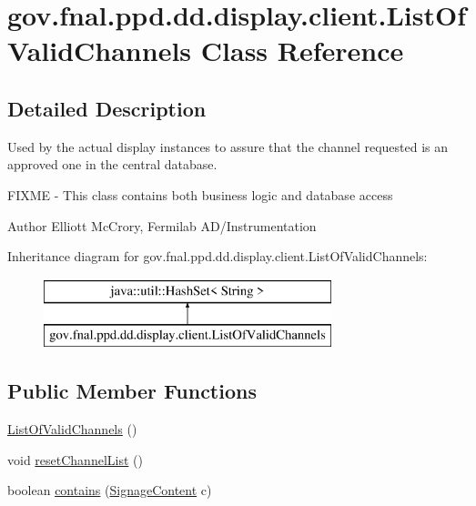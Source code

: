 \hypertarget{classgov_1_1fnal_1_1ppd_1_1dd_1_1display_1_1client_1_1ListOfValidChannels}{\section{gov.\-fnal.\-ppd.\-dd.\-display.\-client.\-List\-Of\-Valid\-Channels Class Reference}
\label{classgov_1_1fnal_1_1ppd_1_1dd_1_1display_1_1client_1_1ListOfValidChannels}
}


\subsection{Detailed Description}
Used by the actual display instances to assure that the channel requested is an approved one in the central database.

F\-I\-X\-M\-E -\/ This class contains both business logic and database access

\begin{DoxyAuthor}{Author}
Elliott Mc\-Crory, Fermilab A\-D/\-Instrumentation 
\end{DoxyAuthor}
Inheritance diagram for gov.\-fnal.\-ppd.\-dd.\-display.\-client.\-List\-Of\-Valid\-Channels\-:\begin{figure}[H]
\begin{center}
\leavevmode
\includegraphics[height=2.000000cm]{classgov_1_1fnal_1_1ppd_1_1dd_1_1display_1_1client_1_1ListOfValidChannels}
\end{center}
\end{figure}
\subsection*{Public Member Functions}
\begin{DoxyCompactItemize}
\item 
\hyperlink{classgov_1_1fnal_1_1ppd_1_1dd_1_1display_1_1client_1_1ListOfValidChannels_a32b06c35045255ed512433f0a9c3d115}{List\-Of\-Valid\-Channels} ()
\item 
void \hyperlink{classgov_1_1fnal_1_1ppd_1_1dd_1_1display_1_1client_1_1ListOfValidChannels_ac7e8b27fed18f295c739273b25cc16f3}{reset\-Channel\-List} ()
\item 
boolean \hyperlink{classgov_1_1fnal_1_1ppd_1_1dd_1_1display_1_1client_1_1ListOfValidChannels_a46ab473927c0c932b8465dd400e5058b}{contains} (\hyperlink{interfacegov_1_1fnal_1_1ppd_1_1dd_1_1signage_1_1SignageContent}{Signage\-Content} c)
\end{DoxyCompactItemize}


